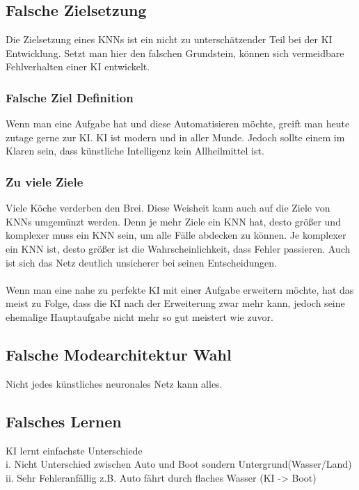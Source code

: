 \documentclass[12pt,oneside,a4paper,parskip]{scrbook}
\begin{document}
\subsection{Falsche Zielsetzung}
Die Zielsetzung eines KNNs ist ein nicht zu unterschätzender Teil bei der KI Entwicklung. Setzt man hier den falschen Grundstein, können sich vermeidbare Fehlverhalten einer KI entwickelt.
\subsubsection{Falsche Ziel Definition}
Wenn man eine Aufgabe hat und diese Automatisieren möchte, greift man heute zutage gerne zur KI. KI ist modern und in aller Munde. Jedoch sollte einem im Klaren sein, dass künstliche Intelligenz kein Allheilmittel ist.
\subsubsection{Zu viele Ziele}
Viele Köche verderben den Brei. Diese Weisheit kann auch auf die Ziele von KNNs umgemünzt werden. Denn je mehr Ziele ein KNN hat, desto größer und komplexer muss ein KNN sein, um alle Fälle abdecken zu können. Je komplexer ein KNN ist, desto größer ist die Wahrscheinlichkeit, dass Fehler passieren. Auch ist sich das Netz deutlich unsicherer bei seinen Entscheidungen.
\\\\ %
Wenn man eine nahe zu perfekte KI mit einer Aufgabe erweitern möchte, hat das meist zu Folge, dass die KI nach der Erweiterung zwar mehr kann, jedoch seine ehemalige Hauptaufgabe nicht mehr so gut meistert wie zuvor.
\subsection{Falsche Modearchitektur Wahl}
Nicht jedes künstliches neuronales Netz kann alles. 
\subsection{Falsches Lernen}
KI lernt einfachste Unterschiede
\\i.	Nicht Unterschied zwischen Auto und Boot sondern Untergrund(Wasser/Land)
\\ii.	Sehr Fehleranfällig z.B. Auto fährt durch flaches Wasser (KI -> Boot)
\end{document}
